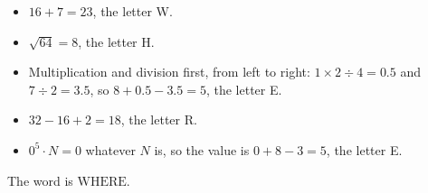 \begin{itemize}
\item[(i)] $16+7=23$, the letter W.
\item[(ii)] $\sqrt{64}=8$, the letter H.
\item[(iii)] Multiplication and division first, from left to right: $1\times2\div4=0.5$ and $7\div2=3.5$, so $8+0.5-3.5=5$, the letter E.
\item[(iv)] $32-16+2=18$, the letter R.
\item[(v)] $0^5\cdot N=0$ whatever $N$ is, so the value is $0+8-3=5$, the letter E.
\end{itemize}
The word is $\boxed{\text{WHERE}}$.
